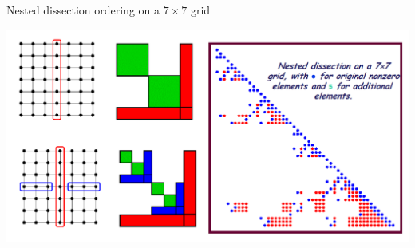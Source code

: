 \documentclass[handout]{beamer}
{
\usepackage{fullpage}
\usepackage{hyperref}
\usepackage{amssymb} 
}
\begin{document}
\begin{frame}{Nested dissection ordering on a $7 \times 7$ grid} 
  \begin{center}
\includegraphics[width=0.90\linewidth]{figures/fill4.png}
    \end{center}
\end{frame}
\end{document}
